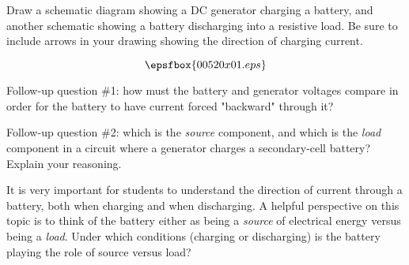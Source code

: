 

Draw a schematic diagram showing a DC generator charging a battery, and another schematic showing a battery discharging into a resistive load.  Be sure to include arrows in your drawing showing the direction of charging current.







$$\epsfbox{00520x01.eps}$$

\vskip 10pt

Follow-up question \#1: how must the battery and generator voltages compare in order for the battery to have current forced "backward" through it?

\vskip 10pt

Follow-up question \#2: which is the {\it source} component, and which is the {\it load} component in a circuit where a generator charges a secondary-cell battery?  Explain your reasoning.







It is very important for students to understand the direction of current through a battery, both when charging and when discharging.  A helpful perspective on this topic is to think of the battery either as being a {\it source} of electrical energy versus being a {\it load}.  Under which conditions (charging or discharging) is the battery playing the role of source versus load?




